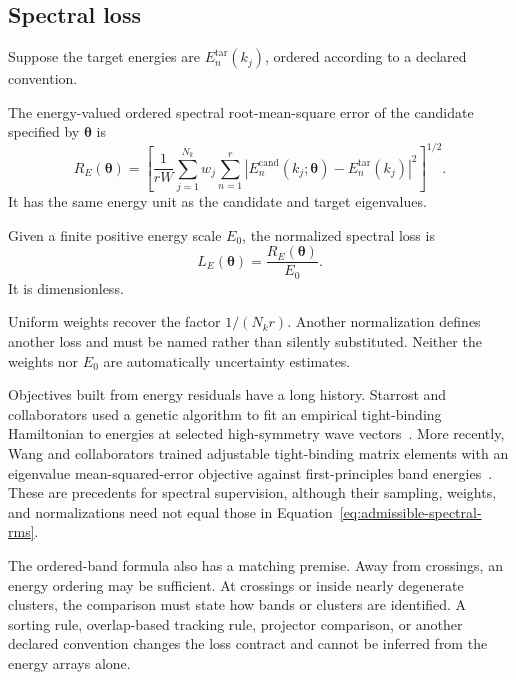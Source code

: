 \subsection{Spectral loss}

Suppose the target energies are $E_n^{\mathrm{tar}}(k_j)$, ordered according
to a declared convention.

\begin{definition}
The energy-valued ordered spectral root-mean-square error of the candidate
specified by $\boldsymbol\theta$ is
\begin{equation}
  R_E(\boldsymbol\theta)
  =
  \left[
    \frac{1}{rW}
    \sum_{j=1}^{N_k}w_j\sum_{n=1}^{r}
    \left|
      E_n^{\mathrm{cand}}(k_j;\boldsymbol\theta)
      -E_n^{\mathrm{tar}}(k_j)
    \right|^2
  \right]^{1/2}.
  \label{eq:admissible-spectral-rms-error}
\end{equation}
It has the same energy unit as the candidate and target eigenvalues.
\end{definition}

\begin{definition}
Given a finite positive energy scale $E_0$, the normalized spectral loss is
\begin{equation}
  L_E(\boldsymbol\theta)
  =
  \frac{R_E(\boldsymbol\theta)}{E_0}.
  \label{eq:admissible-spectral-rms}
\end{equation}
It is dimensionless.
\end{definition}

Uniform weights recover the factor $1/(N_k r)$. Another normalization defines
another loss and must be named rather than silently substituted. Neither the
weights nor $E_0$ are automatically uncertainty estimates.

Objectives built from energy residuals have a long history. Starrost and
collaborators used a genetic algorithm to fit an empirical tight-binding
Hamiltonian to energies at selected high-symmetry wave
vectors~\cite{starrost1996}. More recently, Wang and collaborators trained adjustable
tight-binding matrix elements with an eigenvalue mean-squared-error objective
against first-principles band energies~\cite{wangEtAl2021}. These are
precedents for spectral supervision, although their sampling, weights, and
normalizations need not equal those in
Equation~\eqref{eq:admissible-spectral-rms}.

The ordered-band formula also has a matching premise. Away from crossings, an
energy ordering may be sufficient. At crossings or inside nearly degenerate
clusters, the comparison must state how bands or clusters are identified. A
sorting rule, overlap-based tracking rule, projector comparison, or another
declared convention changes the loss contract and cannot be inferred from the
energy arrays alone.

